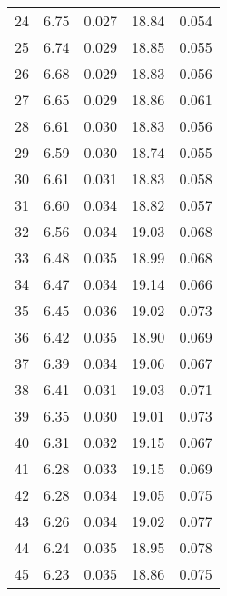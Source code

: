 \begin{table}
\begin{tabular}{c|ll|ll}
24 & 6.75 & 0.027 & 18.84 & 0.054 \\
25 & 6.74 & 0.029 & 18.85 & 0.055 \\
26 & 6.68 & 0.029 & 18.83 & 0.056 \\
27 & 6.65 & 0.029 & 18.86 & 0.061 \\
28 & 6.61 & 0.030 & 18.83 & 0.056 \\
29 & 6.59 & 0.030 & 18.74 & 0.055 \\
30 & 6.61 & 0.031 & 18.83 & 0.058 \\
31 & 6.60 & 0.034 & 18.82 & 0.057 \\
32 & 6.56 & 0.034 & 19.03 & 0.068 \\
33 & 6.48 & 0.035 & 18.99 & 0.068 \\
34 & 6.47 & 0.034 & 19.14 & 0.066 \\
35 & 6.45 & 0.036 & 19.02 & 0.073 \\
36 & 6.42 & 0.035 & 18.90 & 0.069 \\
37 & 6.39 & 0.034 & 19.06 & 0.067 \\
38 & 6.41 & 0.031 & 19.03 & 0.071 \\
39 & 6.35 & 0.030 & 19.01 & 0.073 \\
40 & 6.31 & 0.032 & 19.15 & 0.067 \\
41 & 6.28 & 0.033 & 19.15 & 0.069 \\
42 & 6.28 & 0.034 & 19.05 & 0.075 \\
43 & 6.26 & 0.034 & 19.02 & 0.077 \\
44 & 6.24 & 0.035 & 18.95 & 0.078 \\
45 & 6.23 & 0.035 & 18.86 & 0.075 \\
               \hline
        \end{tabular}
    \end{table}
    \clearpage

